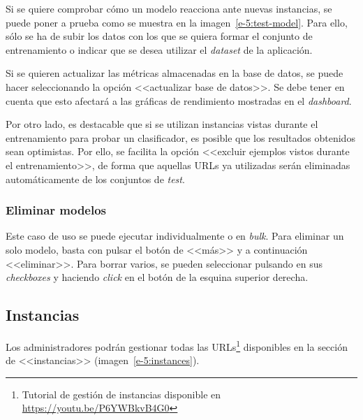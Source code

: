 Si se quiere comprobar cómo un modelo reacciona ante nuevas instancias, se puede poner a prueba como se muestra en la imagen~\ref{e-5:test-model}. Para ello, sólo se ha de subir los datos con los que se quiera formar el conjunto de entrenamiento o indicar que se desea utilizar el \textit{dataset} de la aplicación.

Si se quieren actualizar las métricas almacenadas en la base de datos, se puede hacer seleccionando la opción <<actualizar base de datos>>. Se debe tener en cuenta que esto afectará a las gráficas de rendimiento mostradas en el \textit{dashboard}.

Por otro lado, es destacable que si se utilizan instancias vistas durante el entrenamiento para probar un clasificador, es posible que los resultados obtenidos sean optimistas. Por ello, se facilita la opción <<excluir ejemplos vistos durante el entrenamiento>>, de forma que aquellas URLs ya utilizadas serán eliminadas automáticamente de los conjuntos de \textit{test}.

\subsubsection{Eliminar modelos}

Este caso de uso se puede ejecutar individualmente o en \textit{bulk}. Para eliminar un solo modelo, basta con pulsar el botón de <<más>> y a continuación <<eliminar>>. Para borrar varios, se pueden seleccionar pulsando en sus \textit{checkboxes} y haciendo \textit{click} en el botón de la esquina superior derecha.

\subsection{Instancias}
\label{s-e:instances}

Los administradores podrán gestionar todas las URLs\footnote{Tutorial de gestión de instancias disponible en \url{https://youtu.be/P6YWBkvB4G0}} disponibles en la sección de <<instancias>> (imagen~\ref{e-5:instances}).

